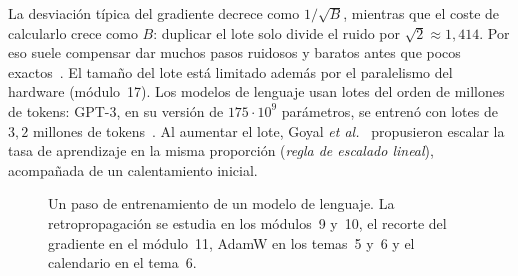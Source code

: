 \begin{observacion}
La desviación típica del gradiente decrece como $1/\sqrt{B}$, mientras que el coste de calcularlo crece como $B$: duplicar el lote solo divide el ruido por $\sqrt2\approx 1{,}414$. Por eso suele compensar dar muchos pasos ruidosos y baratos antes que pocos exactos~\cite[§8.1.3]{gbc}. El tamaño del lote está limitado además por el paralelismo del hardware (módulo~17). Los modelos de lenguaje usan lotes del orden de millones de tokens: GPT-3, en su versión de $175\cdot 10^{9}$ parámetros, se entrenó con lotes de $3{,}2$ millones de tokens~\cite[tabla~2.1]{gpt3}. Al aumentar el lote, Goyal \emph{et al.}~\cite{goyal} propusieron escalar la tasa de aprendizaje en la misma proporción (\emph{regla de escalado lineal}), acompañada de un calentamiento inicial.
\end{observacion}

\begin{figure}[h]
\centering
{}
\caption{Un paso de entrenamiento de un modelo de lenguaje. La retropropagación se estudia en los módulos~9 y~10, el recorte del gradiente en el módulo~11, AdamW en los temas~5 y~6 y el calendario en el tema~6.}
\label{fig:bucle}
\end{figure}

